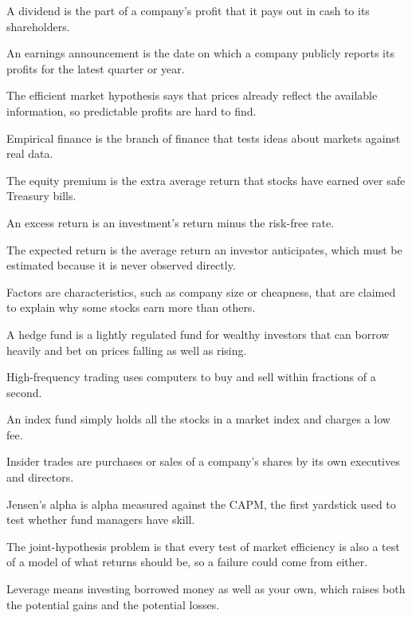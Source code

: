 \begin{keyterms}
\begin{description}[leftmargin=0pt, itemsep=2pt, parsep=0pt, font=\normalfont\bfseries\color{FEMaroon}]
  \item[Dividend.] A dividend is the part of a company's profit that it pays out in cash to its shareholders.
  \item[Earnings announcement.] An earnings announcement is the date on which a company publicly reports its profits for the latest quarter or year.
  \item[Efficient market hypothesis.] The efficient market hypothesis says that prices already reflect the available information, so predictable profits are hard to find.
  \item[Empirical finance.] Empirical finance is the branch of finance that tests ideas about markets against real data.
  \item[Equity premium.] The equity premium is the extra average return that stocks have earned over safe Treasury bills.
  \item[Excess return.] An excess return is an investment's return minus the risk-free rate.
  \item[Expected return.] The expected return is the average return an investor anticipates, which must be estimated because it is never observed directly.
  \item[Factors.] Factors are characteristics, such as company size or cheapness, that are claimed to explain why some stocks earn more than others.
  \item[Hedge fund.] A hedge fund is a lightly regulated fund for wealthy investors that can borrow heavily and bet on prices falling as well as rising.
  \item[High-frequency trading.] High-frequency trading uses computers to buy and sell within fractions of a second.
  \item[Index fund.] An index fund simply holds all the stocks in a market index and charges a low fee.
  \item[Insider trades.] Insider trades are purchases or sales of a company's shares by its own executives and directors.
  \item[Jensen's alpha.] Jensen's alpha is alpha measured against the CAPM, the first yardstick used to test whether fund managers have skill.
  \item[Joint-hypothesis problem.] The joint-hypothesis problem is that every test of market efficiency is also a test of a model of what returns should be, so a failure could come from either.
  \item[Leverage.] Leverage means investing borrowed money as well as your own, which raises both the potential gains and the potential losses.

\end{description}
\end{keyterms}
